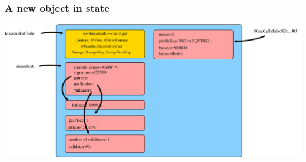 \documentclass[11pt]{beamer}  %
\begin{document}
\begin{frame}\frametitle{A new object in state}

  \begin{center}
    \includegraphics[scale=0.37,clip=false]{pictures/state2.pdf}
  \end{center}
  
\end{frame}
\end{document}
